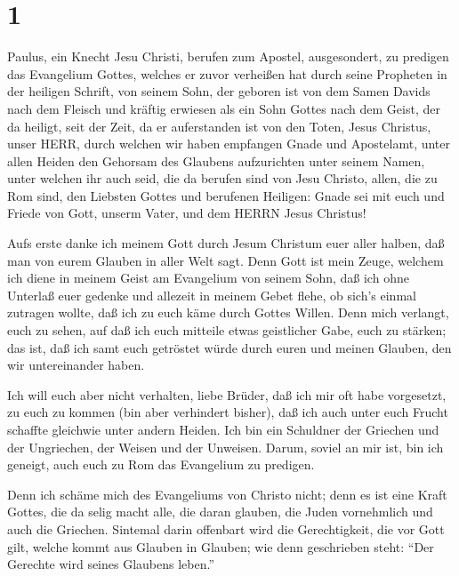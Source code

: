 \hypertarget{section}{%
\section{1}\label{section}}

 Paulus, ein Knecht Jesu Christi, berufen zum Apostel,
ausgesondert, zu predigen das Evangelium Gottes,  welches er
zuvor verheißen hat durch seine Propheten in der heiligen Schrift,
 von seinem Sohn, der geboren ist von dem Samen Davids nach
dem Fleisch  und kräftig erwiesen als ein Sohn Gottes nach
dem Geist, der da heiligt, seit der Zeit, da er auferstanden ist von den
Toten, Jesus Christus, unser HERR,  durch welchen wir haben
empfangen Gnade und Apostelamt, unter allen Heiden den Gehorsam des
Glaubens aufzurichten unter seinem Namen,  unter welchen ihr
auch seid, die da berufen sind von Jesu Christo,  allen, die
zu Rom sind, den Liebsten Gottes und berufenen Heiligen: Gnade sei mit
euch und Friede von Gott, unserm Vater, und dem HERRN Jesus Christus!

 Aufs erste danke ich meinem Gott durch Jesum Christum euer
aller halben, daß man von eurem Glauben in aller Welt sagt. 
Denn Gott ist mein Zeuge, welchem ich diene in meinem Geist am
Evangelium von seinem Sohn, daß ich ohne Unterlaß euer gedenke
 und allezeit in meinem Gebet flehe, ob sich's einmal
zutragen wollte, daß ich zu euch käme durch Gottes Willen. 
Denn mich verlangt, euch zu sehen, auf daß ich euch mitteile etwas
geistlicher Gabe, euch zu stärken;  das ist, daß ich samt
euch getröstet würde durch euren und meinen Glauben, den wir
untereinander haben.

 Ich will euch aber nicht verhalten, liebe Brüder, daß ich
mir oft habe vorgesetzt, zu euch zu kommen (bin aber verhindert bisher),
daß ich auch unter euch Frucht schaffte gleichwie unter andern Heiden.
 Ich bin ein Schuldner der Griechen und der Ungriechen, der
Weisen und der Unweisen.  Darum, soviel an mir ist, bin ich
geneigt, auch euch zu Rom das Evangelium zu predigen.

 Denn ich schäme mich des Evangeliums von Christo nicht;
denn es ist eine Kraft Gottes, die da selig macht alle, die daran
glauben, die Juden vornehmlich und auch die Griechen. 
Sintemal darin offenbart wird die Gerechtigkeit, die vor Gott gilt,
welche kommt aus Glauben in Glauben; wie denn geschrieben steht: ``Der
Gerechte wird seines Glaubens leben.''

